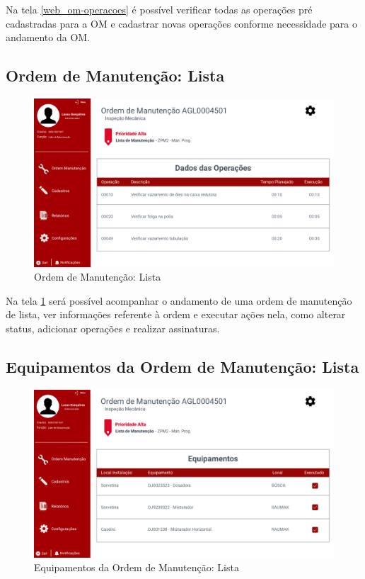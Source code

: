 Na tela \ref{web_om-operacoes} é possível verificar todas as operações pré cadastradas para a OM e cadastrar novas operações conforme necessidade para o andamento da OM.

\newpage
\subsection{Ordem de Manutenção: Lista}

\begin{figure}[htb]
	\caption{\label{web_om-lista}Ordem de Manutenção: Lista}
	\begin{center}
		\includegraphics[scale=0.40]{./Figuras/web/om-lista.png}
	\end{center}
\end{figure}

Na tela \ref{web_om-lista} será possível acompanhar o andamento de uma ordem de manutenção de lista, ver informações referente à ordem e executar ações nela, como alterar status, adicionar operações e realizar assinaturas.

\newpage
\subsection{Equipamentos da Ordem de Manutenção: Lista}

\begin{figure}[htb]
	\caption{\label{web_om-lista-equipamentos}Equipamentos da Ordem de Manutenção: Lista}
	\begin{center}
		\includegraphics[scale=0.40]{./Figuras/web/om-lista-equipamentos.png}
	\end{center}
\end{figure}

